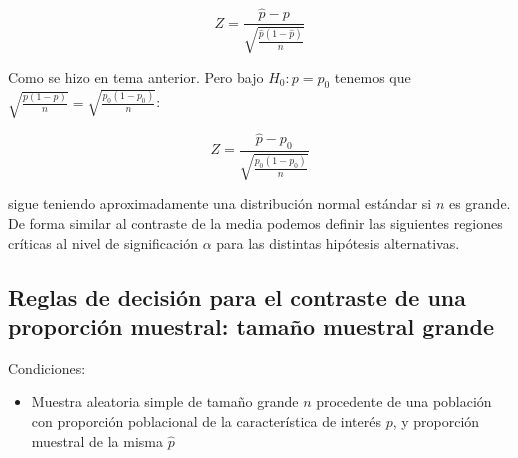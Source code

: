 \documentclass[12pt]{report}
\begin{document}
      $$Z=\frac{\hat{p}-p}{\sqrt{\frac{\hat{p}(1-\hat{p})}{n}}}$$

      Como se hizo en tema anterior. Pero bajo $H_{0}:p=p_{0}$ tenemos
      que $\sqrt{\frac{p(1-p)}{n}}=\sqrt{\frac{p_{0}(1-p_{0})}{n}}$:

      $$Z=\frac{\hat{p}-p_0}{\sqrt{\frac{p_{0}(1-p_{0})}{n}}}$$

      sigue teniendo aproximadamente una distribución normal estándar
      si $n$ es grande.
      De forma similar al contraste de la media podemos definir las
      siguientes regiones críticas al nivel de significación $\alpha$
      para las distintas hipótesis alternativas.

  \subsection{Reglas de decisión para el contraste de una proporción muestral: tamaño muestral
       grande}

       Condiciones:
       \begin{itemize}
       \item Muestra aleatoria simple de tamaño grande $n$ procedente de
       una población con proporción poblacional de la característica
       de interés $p$, y proporción muestral de la misma $\hat{p}$
       \end{itemize}
\end{document}
